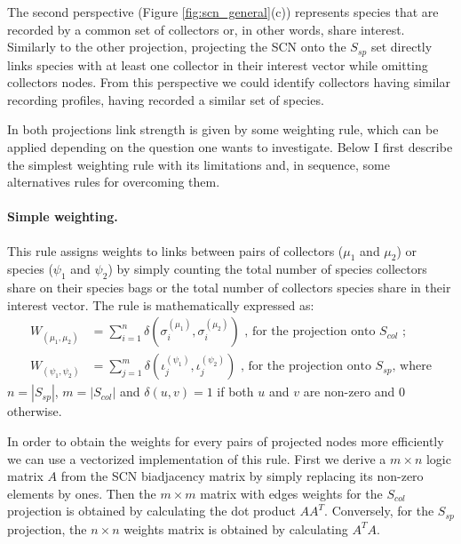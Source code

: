 The second perspective (Figure \ref{fig:scn_general}(c)) represents species that are recorded by a common set of collectors or, in other words, share interest. Similarly to the other projection, projecting the SCN onto the $S_{sp}$ set directly links species with at least one collector in their interest vector while omitting collectors nodes. From this perspective we could identify collectors having similar recording profiles, having recorded a similar set of species. 

In both projections link strength is given by some weighting rule, which can be applied depending on the question one wants to investigate. Below I first describe the simplest weighting rule with its limitations and, in sequence, some alternatives rules for overcoming them.

\paragraph*{Simple weighting.}
This rule assigns weights to links between pairs of collectors ($\mu_1$ and $\mu_2$) or species ($\psi_1$ and $\psi_2$) by simply counting the total number of species collectors share on their species bags or the total number of collectors species share in their interest vector. The rule is mathematically expressed as:
\begin{equation} \label{eq:simple_weighting}
\begin{split}
W_{(\mu_1, \mu_2)} &= \sum_{i=1}^{n} \delta(\sigma_i^{(\mu_1)}, \sigma_i^{(\mu_2)})\mbox{ , for the projection onto }S_{col}\mbox{ ;}\\
W_{(\psi_1, \psi_2)} &= \sum_{j=1}^{m} \delta(\iota_j^{(\psi_1)}, \iota_j^{(\psi_2)})
\mbox{ , for the projection onto }S_{sp}\mbox{, where}
\end{split}
\end{equation}
$n = |S_{sp}|$, $m = |S_{col}|$ and $\delta(u,v)=1$ if both $u$ and $v$ are non-zero and $0$ otherwise.

In order to obtain the weights for every pairs of projected nodes more efficiently we can use a vectorized implementation of this rule. First we derive a $m\times n$ logic matrix $A$ from the SCN biadjacency matrix by simply replacing its non-zero elements by ones. 
Then the $m \times m$ matrix with edges weights for the $S_{col}$ projection is obtained by calculating the dot product $A A^T$.
Conversely, for the $S_{sp}$ projection, the $n \times n$ weights matrix is obtained by calculating $A^T A$.

